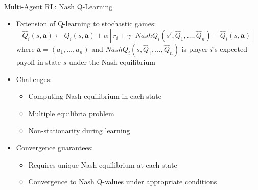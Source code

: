 \documentclass[10pt]{beamer}
\begin{document}
\begin{frame}{Multi-Agent RL: Nash Q-Learning}
    \begin{itemize}
        \item Extension of Q-learning to stochastic games:
        \begin{equation}
            \hat{Q}_i(s,\mathbf{a}) \leftarrow \hat{Q}_i(s,\mathbf{a}) + \alpha \left[ r_i + \gamma \cdot NashQ_i(s',\hat{Q}_1,\ldots,\hat{Q}_n) - \hat{Q}_i(s,\mathbf{a}) \right]
        \end{equation}
        where $\mathbf{a} = (a_1,\ldots,a_n)$ and $NashQ_i(s,\hat{Q}_1,\ldots,\hat{Q}_n)$ is player $i$'s expected payoff in state $s$ under the Nash equilibrium
        \vspace{0.2cm}
        \item Challenges:
        \begin{itemize}
            \item Computing Nash equilibrium in each state
            \item Multiple equilibria problem
            \item Non-stationarity during learning
        \end{itemize}
        \vspace{0.2cm}
        \item Convergence guarantees:
        \begin{itemize}
            \item Requires unique Nash equilibrium at each state
            \item Convergence to Nash Q-values under appropriate conditions
        \end{itemize}
    \end{itemize}
\end{frame}

\end{document}

